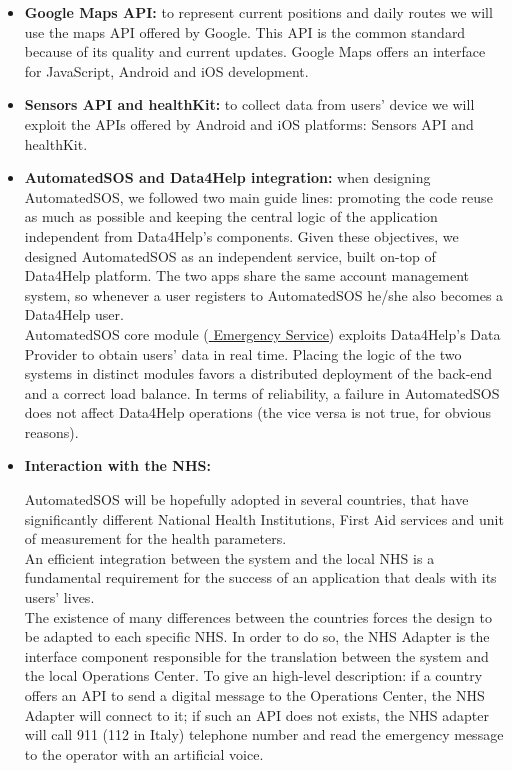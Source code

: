 \begin{itemize}
    \item \textbf{Google Maps API:} to represent current positions and daily routes we will use the maps API offered by Google. This API is the common standard because of its quality and current updates. Google Maps offers an interface for JavaScript\cite{mapsAPI-JS}, Android\cite{mapsAPI-Android} and iOS\cite{mapsAPI-iOS} development.
    \item \textbf{Sensors API and healthKit:} to collect data from users' device we will exploit the APIs offered by Android and iOS platforms: Sensors API\cite{sensorsAPI} and healthKit\cite{healthKit}.
    \item \textbf{AutomatedSOS and Data4Help integration:} when designing AutomatedSOS, we followed two main guide lines: promoting the code reuse as much as possible and keeping the central logic of the application independent from Data4Help's components.
    Given these objectives, we designed AutomatedSOS as an independent service, built on-top of Data4Help platform. 
    The two apps share the same account management system, so whenever a user registers to AutomatedSOS he/she also becomes a Data4Help user.\\
    AutomatedSOS core module (\hyperlink{ES}{ \underline{Emergency Service}}) exploits Data4Help's Data Provider to obtain users' data in real time.
    Placing the logic of the two systems in distinct modules favors a distributed deployment of the back-end and a correct load balance.
    In terms of reliability, a failure in AutomatedSOS does not affect Data4Help operations (the vice versa is not true, for obvious reasons).
    \item \hypertarget{NHS_API}{\textbf{Interaction with the NHS:}} AutomatedSOS will be hopefully adopted in several countries, that have significantly different National Health Institutions, First Aid services and unit of measurement for the health parameters.\\
    An efficient integration between the system and the local NHS is a fundamental requirement for the success of an application that deals with its users' lives.\\
    The existence of many differences between the countries forces the design to be adapted to each specific NHS. In order to do so, the NHS Adapter is the interface component responsible for the translation between the system and the local Operations Center.
    To give an high-level description: if a country offers an API to send a digital message to the Operations Center, the NHS Adapter will connect to it; if such an API does not exists, the NHS adapter will call 911 (112 in Italy) telephone number and read the emergency message to the operator with an artificial voice.
\end{itemize}